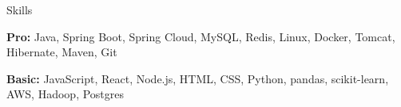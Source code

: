 \documentclass{resume} %
\begin{document}
\begin{skillSection}{Skills}
\item {\bf Pro:} Java, Spring Boot, Spring Cloud, MySQL, Redis, Linux, Docker, Tomcat, Hibernate, Maven, Git
\item {\bf Basic:} JavaScript, React, Node.js, HTML, CSS, Python, pandas, scikit-learn, AWS, Hadoop, Postgres
\end{skillSection}
\end{document}
